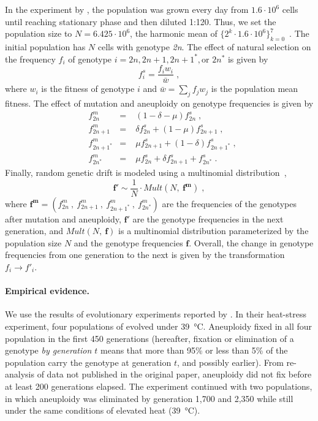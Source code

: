 \documentclass[12pt]{extarticle}
\let\vec\mathbf
\newcommand{\euwt}{\emph{2n}}
\begin{document}
In the experiment by \citet{Yona2012}, the population was grown every day from $1.6 \cdot 10^6$ cells until reaching stationary phase and then diluted 1:120.
Thus, we set the population size to $N=6.425 \cdot 10^6$, the harmonic mean of $\{2^k \cdot 1.6 \cdot 10^6\}_{k=0}^{7}$~\citep{Crow1970}.
The initial population has $N$ cells with genotype \euwt. 
The effect of natural selection on the frequency $f_i$ of genotype $i = 2n, 2n+1, 2n+1^*, \text{or } 2n^*$ is given by
    \begin{equation} \label{eq:selection-single} 
      f^s_i = \frac{f_i w_i}{\bar{w}} \;,
    \end{equation}
where $w_i$ is the fitness of genotype $i$ and $\bar{w} = \sum_{j}{f_j w_j}$ is the population mean fitness.
The effect of mutation and aneuploidy on genotype frequencies is given by
    \begin{equation} \label{eq:mutation-aneuploidy-single}
    \begin{aligned}
      &f^m_{2n} &=&\; (1 - \delta - \mu) f^s_{2n}  \;,\\
      &f^m_{2n+1} &=&\; \delta f^s_{2n} + (1 - \mu) f^s_{2n+1}  \;,\\
      &f^m_{2n+1^*} &=&\; \mu f^s_{2n+1} + (1-\delta) f^s_{2n+1^*}  \;,\\
      &f^m_{2n^*} &=&\; \mu f^s_{2n} + \delta f^s_{2n+1} + f^s_{2n^*}  \;.
    \end{aligned}
    \end{equation}
Finally, random genetic drift is modeled using a multinomial distribution~\citep{Otto2007},
    \begin{equation} \label{eq:drift-single}
      \vec{f'} \sim \frac{1}{N} \cdot \mathit{Mult}(N,\ \vec{f^m}) \;,
    \end{equation}
where $\vec{f^m}=(f^m_{2n}\ ,\ f^m_{2n+1}\ ,\ f^m_{2n+1^*}\ ,\ f^m_{2n^*})$ are the frequencies of the genotypes after mutation and aneuploidy, $\vec{f'}$ are the genotype frequencies in the next generation, and $Mult(N,\ \vec{f})$ is a multinomial distribution parameterized by the population size $N$ and the genotype frequencies $\vec{f}$.
Overall, the change in genotype frequencies from one generation to the next is given by the transformation $f_i \to f'_i$.


\paragraph{Empirical evidence.}

We use the results of evolutionary experiments reported by \citet{Yona2012}.
In their heat-stress experiment, four populations of \yeast evolved under \SI{39}{\celsius}. Aneuploidy fixed in all four population in the first 450 generations (hereafter, fixation or elimination of a genotype \emph{by generation $t$} means that more than 95\% or less than 5\% of the population carry the genotype at generation $t$, and possibly earlier). 
From re-analysis of data not published in the original paper, aneuploidy did not fix before at least 200 generations elapsed.
The experiment continued with two populations, in which aneuploidy was eliminated by generation 1,700 and 2,350 while still under the same conditions of elevated heat (\SI{39}{\celsius}).
\end{document}
